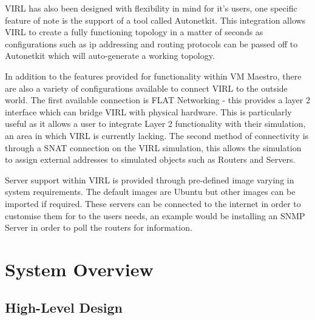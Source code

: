 \documentclass[11pt]{report}
\begin{document}
VIRL has also been designed with flexibility in mind for it's users, one specific feature of note is the support of a tool called Autonetkit. This integration allows VIRL to create a fully functioning topology in a matter of seconds as configurations such as ip addressing and routing protocols can be passed off to Autonetkit which will auto-generate a working topology.

In addition to the features provided for functionality within VM Maestro, there are also a variety of configurations available to connect VIRL to the outside world. The first available connection is FLAT Networking - this provides a layer 2 interface which can bridge VIRL with physical hardware. This is particularly useful as it allows a user to integrate Layer 2 functionality with their simulation, an area in which VIRL is currently lacking. The second method of connectivity is through a SNAT connection on the VIRL simulation, this allows the simulation to assign external addresses to simulated objects such as Routers and Servers.

Server support within VIRL is provided through pre-defined image varying in system requirements. The default images are Ubuntu but other images can be imported if required. These servers can be connected to the internet in order to customise them for to the users needs, an example would be installing an SNMP Server in order to poll the routers for information.

\pagebreak

\chapter{System Overview}

\section{High-Level Design}
\end{document}
